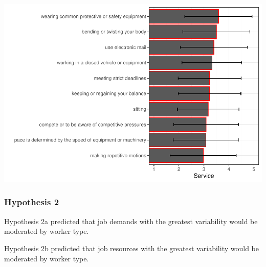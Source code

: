\documentclass[
  english,
  man]{apa6}
\begin{document}
\includegraphics{SIOPjdr2_files/figure-latex/unnamed-chunk-9-1.pdf}

\hypertarget{hypothesis-2}{%
\subsubsection{Hypothesis 2}\label{hypothesis-2}}

Hypothesis 2a predicted that job demands with the greatest variability would be moderated by worker type.

Hypothesis 2b predicted that job resources with the greatest variability would be moderated by worker type.
\end{document}
